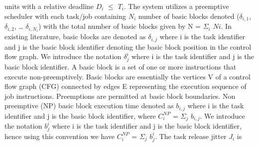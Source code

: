 units with a relative deadline \begin{math}D_{i}\end{math} \begin{math}\leq\end{math} \begin{math}T_{i}\end{math}.  The system utilizes a preemptive scheduler with each task/job containing \begin{math}N_{i}\end{math} number of basic blocks denoted (\begin{math}\delta_{i,1}\end{math}, \begin{math}\delta_{i,2}\end{math}, … \begin{math}\delta_{i,N_{i}}\end{math}) with the total number of basic blocks given by N = \begin{math}\Sigma_{i}\end{math} \begin{math}N{i}\end{math}. In existing literature, basic blocks are denoted as \begin{math}\delta_{i,j}\end{math} where i is the task identifier and j is the basic block identifier denoting the basic block position in the control flow graph.  We introduce the notation \begin{math}\delta_{j}^{i}\end{math} where i is the task identifier and j is the basic block identifier. A basic block is a set of one or more instructions that execute non-preemptively.  Basic blocks are essentially the vertices V of a control flow graph (CFG) connected by edges E representing the execution sequence of job instructions. Preemptions are permitted at basic block boundaries.  Non preemptive (NP) basic block execution time denoted as \begin{math}b_{i,j}\end{math} where i is the task identifier and j is the basic block identifier, where \begin{math}C_{i}^{NP}\end{math} = \begin{math}\Sigma_{j}\end{math} \begin{math}b_{i,j}\end{math}. We introduce the notation \begin{math}b_{j}^{i}\end{math} where i is the task identifier and j is the basic block identifier, hence using this convention we have \begin{math}C_{i}^{NP}\end{math} = \begin{math}\Sigma_{j}\end{math} \begin{math}b_{j}^{i}\end{math}. The task release jitter \begin{math}J_{i}\end{math} is 